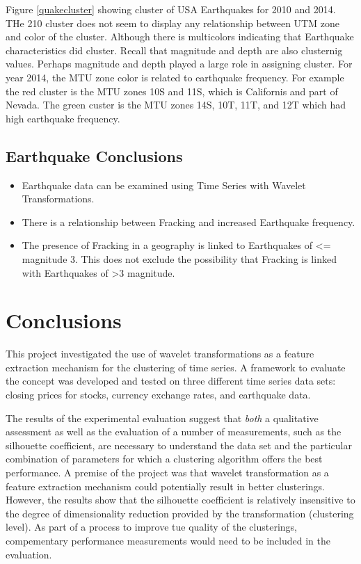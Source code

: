 \documentclass{article}
\begin{document}
Figure \ref{quakecluster} showing cluster of USA Earthquakes for 2010 and 2014.  THe 210 cluster does not seem to display any relationship between UTM zone and color of the cluster.
Although there is multicolors indicating that Earthquake characteristics did cluster.  Recall that magnitude and depth are also clusternig values.  Perhaps magnitude and depth played a large role in assigning cluster.
For year 2014, the MTU zone color is related to earthquake frequency.  For example the red cluster is the MTU zones 10S and 11S, which is Californis and part of Nevada.
The green custer is the MTU zones 14S, 10T, 11T, and 12T which had high earthquake frequency.
\subsection{Earthquake Conclusions}

\begin{itemize}
\item Earthquake data can be examined using Time Series with Wavelet Transformations.
\item There is a relationship between Fracking and increased Earthquake frequency.
\item The presence of Fracking in a geography is linked to Earthquakes of <= magnitude 3. This does not exclude the possibility that Fracking is linked with Earthquakes of  >3 magnitude.
\end{itemize}


\section{Conclusions}

This project investigated the use of wavelet transformations as a feature extraction mechanism for the clustering of time series. A framework to evaluate the concept was developed and tested on three different time series data sets: closing prices for stocks, currency exchange rates, and earthquake data.

The results of the experimental evaluation suggest that {\em both} a qualitative assessment as well as the evaluation of a number of measurements, such as the silhouette coefficient, are necessary to understand the data set and the particular combination of parameters for which a clustering algorithm offers the best performance. A premise of the project was that wavelet transformation as a feature extraction mechanism could potentially result in better clusterings. However, the results show that the silhouette coefficient is relatively insensitive to the degree of dimensionality reduction provided by the transformation (clustering level). As part of a process to improve tue quality of the clusterings, compementary performance measurements would need to be included in the evaluation.
\end{document}
